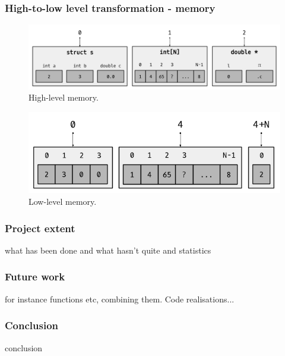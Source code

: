 \begin{frame}[fragile]
\frametitle{High-to-low level transformation - memory}

\begin{center}

\begin{figure}
	\includegraphics[scale=0.31]{images/high_level_memory}
	\caption{High-level memory.}
\end{figure}

\begin{figure}
	\includegraphics[scale=0.31]{images/low_level_memory}
	\caption{Low-level memory.}
\end{figure}

\end{center}

\end{frame}


\begin{frame}[fragile]
\frametitle{Project extent}

what has been done and what hasn't quite and statistics

\end{frame}


\begin{frame}[fragile]
\frametitle{Future work}

for instance functions etc, combining them. Code realisations...

\end{frame}


\begin{frame}[fragile]
\frametitle{Conclusion}

conclusion

\end{frame}




